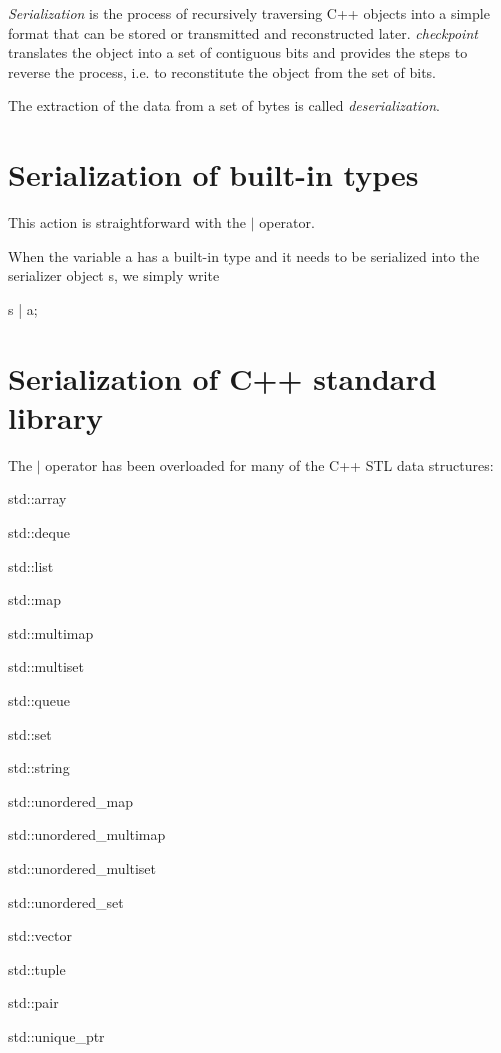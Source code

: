 {\itshape Serialization} is the process of recursively traversing C++ objects into a simple format that can be stored or transmitted and reconstructed later. {\itshape checkpoint} translates the object into a set of contiguous bits and provides the steps to reverse the process, i.\+e. to reconstitute the object from the set of bits.

The extraction of the data from a set of bytes is called {\itshape deserialization}.\hypertarget{ckpt_learn_serialize_serialize_builtin}{}\section{Serialization of built-\/in types}\label{ckpt_learn_serialize_serialize_builtin}
This action is straightforward with the {\ttfamily $\vert$} operator.

When the variable {\ttfamily a} has a built-\/in type and it needs to be serialized into the serializer object {\ttfamily s}, we simply write


\begin{DoxyCode}
s | a;
\end{DoxyCode}
\hypertarget{ckpt_learn_serialize_serialize_stl}{}\section{Serialization of C++ standard library}\label{ckpt_learn_serialize_serialize_stl}
The {\ttfamily $\vert$} operator has been overloaded for many of the C++ S\+TL data structures\+:
\begin{DoxyItemize}
\item {\ttfamily std\+::array}
\item {\ttfamily std\+::deque}
\item {\ttfamily std\+::list}
\item {\ttfamily std\+::map}
\item {\ttfamily std\+::multimap}
\item {\ttfamily std\+::multiset}
\item {\ttfamily std\+::queue}
\item {\ttfamily std\+::set}
\item {\ttfamily std\+::string}
\item {\ttfamily std\+::unordered\+\_\+map}
\item {\ttfamily std\+::unordered\+\_\+multimap}
\item {\ttfamily std\+::unordered\+\_\+multiset}
\item {\ttfamily std\+::unordered\+\_\+set}
\item {\ttfamily std\+::vector}
\item {\ttfamily std\+::tuple}
\item {\ttfamily std\+::pair}
\item {\ttfamily std\+::unique\+\_\+ptr}
\end{DoxyItemize}

